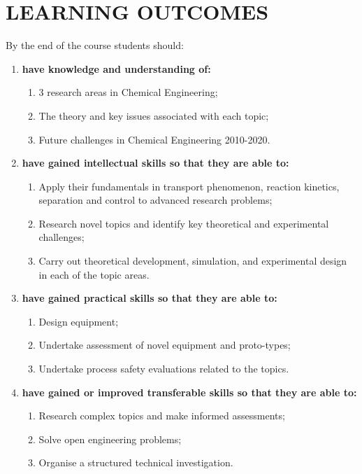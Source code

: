 \documentclass[12pts,a4paper,amsmath,amssymb,floatfix]{article}%
\begin{document}
\section{LEARNING OUTCOMES}
By the end of the course students should:
\begin{enumerate}[{\bf A.}]
\item {\bf have knowledge and understanding of:}
  \begin{enumerate}
    \item 3 research areas in Chemical Engineering;
    \item The theory and key issues associated with each topic;
    \item Future challenges in Chemical Engineering 2010-2020.
  \end{enumerate}
\item {\bf have gained intellectual skills so that they are able to:}
  \begin{enumerate}
    \item Apply their fundamentals in transport phenomenon, reaction kinetics, separation and control to advanced research problems;
    \item Research novel topics and identify key theoretical and experimental challenges;
    \item Carry out theoretical development, simulation, and experimental design in each of the topic areas.
  \end{enumerate}
\item {\bf have gained practical skills so that they are able to:}
  \begin{enumerate}
    \item Design equipment;
    \item Undertake assessment of novel equipment and proto-types;
    \item Undertake process safety evaluations related to the topics.
  \end{enumerate}
\item {\bf have gained or improved transferable skills so that they are able to:}
  \begin{enumerate}
    \item Research complex topics and make informed assessments;
    \item Solve open engineering problems;
    \item Organise a structured technical investigation.
  \end{enumerate}
\end{enumerate}
\end{document}

